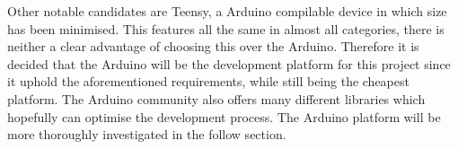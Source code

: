 Other notable candidates are Teensy, a Arduino compilable device in which size has been minimised.
This features all the same in almost all categories, there is neither a clear advantage of choosing this over the Arduino. 
Therefore it is decided that the Arduino will be the development platform for this project since it uphold the aforementioned requirements, while still being the cheapest platform.
The Arduino community also offers many different libraries which hopefully can optimise the development process.
The Arduino platform will be more thoroughly investigated in the follow section.
